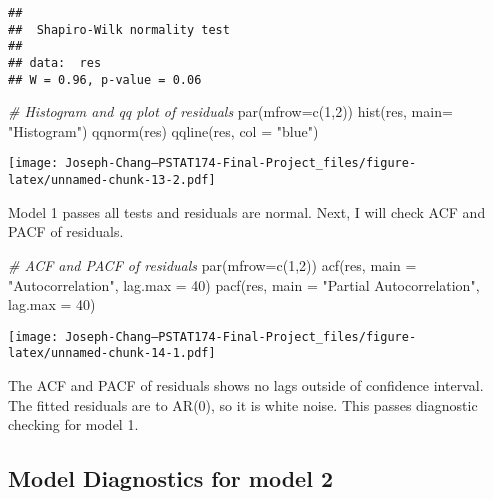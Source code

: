 \documentclass[
]{article}
\newenvironment{Shaded}{\begin{snugshade}}{\end{snugshade}}
\newcommand{\AttributeTok}[1]{\textcolor[rgb]{0.77,0.63,0.00}{#1}}
\newcommand{\CommentTok}[1]{\textcolor[rgb]{0.56,0.35,0.01}{\textit{#1}}}
\newcommand{\DecValTok}[1]{\textcolor[rgb]{0.00,0.00,0.81}{#1}}
\newcommand{\FunctionTok}[1]{\textcolor[rgb]{0.00,0.00,0.00}{#1}}
\newcommand{\NormalTok}[1]{#1}
\newcommand{\StringTok}[1]{\textcolor[rgb]{0.31,0.60,0.02}{#1}}
\begin{document}
\begin{verbatim}
## 
##  Shapiro-Wilk normality test
## 
## data:  res
## W = 0.96, p-value = 0.06
\end{verbatim}

\begin{Shaded}
\begin{Highlighting}[]
\CommentTok{\# Histogram and qq plot of residuals}
\FunctionTok{par}\NormalTok{(}\AttributeTok{mfrow=}\FunctionTok{c}\NormalTok{(}\DecValTok{1}\NormalTok{,}\DecValTok{2}\NormalTok{))}
\FunctionTok{hist}\NormalTok{(res, }\AttributeTok{main=} \StringTok{"Histogram"}\NormalTok{)}
\FunctionTok{qqnorm}\NormalTok{(res)}
\FunctionTok{qqline}\NormalTok{(res, }\AttributeTok{col =} \StringTok{"blue"}\NormalTok{)}
\end{Highlighting}
\end{Shaded}

\texttt{[image: Joseph-Chang---PSTAT174-Final-Project\_files/figure-latex/unnamed-chunk-13-2.pdf]}

Model 1 passes all tests and residuals are normal. Next, I will check
ACF and PACF of residuals.

\begin{Shaded}
\begin{Highlighting}[]
\CommentTok{\# ACF and PACF of residuals}
\FunctionTok{par}\NormalTok{(}\AttributeTok{mfrow=}\FunctionTok{c}\NormalTok{(}\DecValTok{1}\NormalTok{,}\DecValTok{2}\NormalTok{))}
\FunctionTok{acf}\NormalTok{(res, }\AttributeTok{main =} \StringTok{"Autocorrelation"}\NormalTok{, }\AttributeTok{lag.max =} \DecValTok{40}\NormalTok{)}
\FunctionTok{pacf}\NormalTok{(res, }\AttributeTok{main =} \StringTok{"Partial Autocorrelation"}\NormalTok{, }\AttributeTok{lag.max =} \DecValTok{40}\NormalTok{)}
\end{Highlighting}
\end{Shaded}

\texttt{[image: Joseph-Chang---PSTAT174-Final-Project\_files/figure-latex/unnamed-chunk-14-1.pdf]}

The ACF and PACF of residuals shows no lags outside of confidence
interval. The fitted residuals are to AR(0), so it is white noise. This
passes diagnostic checking for model 1.

\hypertarget{model-diagnostics-for-model-2}{%
\subsection{Model Diagnostics for model
2}\label{model-diagnostics-for-model-2}}
\end{document}
